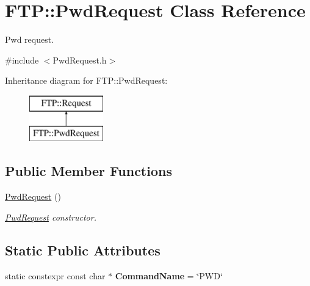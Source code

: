 \hypertarget{classFTP_1_1PwdRequest}{}\section{F\+T\+P\+:\+:Pwd\+Request Class Reference}
\label{classFTP_1_1PwdRequest}


Pwd request.  




{\ttfamily \#include $<$Pwd\+Request.\+h$>$}

Inheritance diagram for F\+T\+P\+:\+:Pwd\+Request\+:\begin{figure}[H]
\begin{center}
\leavevmode
\includegraphics[height=2.000000cm]{classFTP_1_1PwdRequest}
\end{center}
\end{figure}
\subsection*{Public Member Functions}
\begin{DoxyCompactItemize}
\item 
\hypertarget{classFTP_1_1PwdRequest_a403b0aeb6e2ba118c808d16fbe3b78b9}{}\hyperlink{classFTP_1_1PwdRequest_a403b0aeb6e2ba118c808d16fbe3b78b9}{Pwd\+Request} ()\label{classFTP_1_1PwdRequest_a403b0aeb6e2ba118c808d16fbe3b78b9}

\begin{DoxyCompactList}\small\item\em \hyperlink{classFTP_1_1PwdRequest}{Pwd\+Request} constructor. \end{DoxyCompactList}\end{DoxyCompactItemize}
\subsection*{Static Public Attributes}
\begin{DoxyCompactItemize}
\item 
\hypertarget{classFTP_1_1PwdRequest_a5492dc00d110d1c8233af41d0f45c452}{}static constexpr const char $\ast$ {\bfseries Command\+Name} = \char`\"{}P\+W\+D\char`\"{}\label{classFTP_1_1PwdRequest_a5492dc00d110d1c8233af41d0f45c452}

\end{DoxyCompactItemize}


